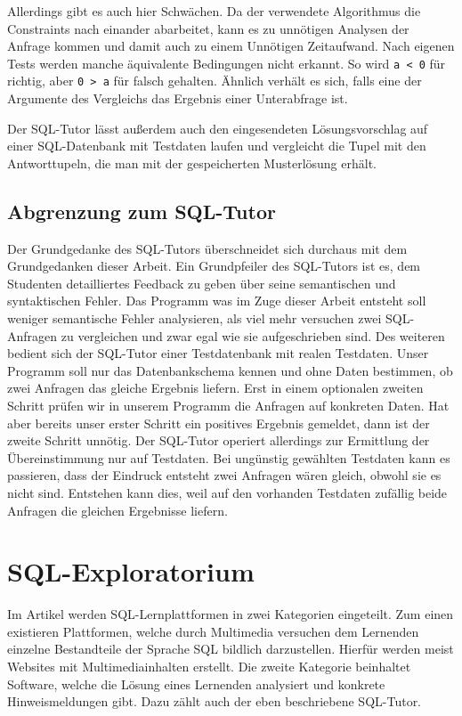 Allerdings gibt es auch hier Schwächen. Da der verwendete Algorithmus die Constraints nach einander abarbeitet, kann es zu unnötigen Analysen der Anfrage kommen und damit auch zu einem Unnötigen Zeitaufwand. Nach eigenen Tests werden manche äquivalente Bedingungen nicht erkannt. So wird \verb|a < 0| für richtig, aber \verb|0 > a| für falsch gehalten. Ähnlich verhält es sich, falls eine der Argumente des Vergleichs das Ergebnis einer Unterabfrage ist.

Der SQL-Tutor lässt außerdem auch den eingesendeten Lösungsvorschlag auf einer SQL-Datenbank mit Testdaten laufen und vergleicht die Tupel mit den Antworttupeln, die man mit der gespeicherten Musterlösung erhält.

\subsection*{Abgrenzung zum SQL-Tutor}

Der Grundgedanke des SQL-Tutors überschneidet sich durchaus mit dem Grundgedanken dieser Arbeit. Ein Grundpfeiler des SQL-Tutors ist es, dem Studenten detailliertes Feedback zu geben über seine semantischen und syntaktischen Fehler. Das Programm was im Zuge dieser Arbeit entsteht soll weniger semantische Fehler analysieren, als viel mehr versuchen zwei SQL-Anfragen zu vergleichen und zwar egal wie sie aufgeschrieben sind. Des weiteren bedient sich der SQL-Tutor einer Testdatenbank mit realen Testdaten. Unser Programm soll nur das Datenbankschema kennen und ohne Daten bestimmen, ob zwei Anfragen das gleiche Ergebnis liefern. Erst in einem optionalen zweiten Schritt prüfen wir in unserem Programm die Anfragen auf konkreten Daten. Hat aber bereits unser erster Schritt ein positives Ergebnis gemeldet, dann ist der zweite Schritt unnötig. Der SQL-Tutor operiert allerdings zur Ermittlung der Übereinstimmung nur auf Testdaten. Bei ungünstig gewählten Testdaten kann es passieren, dass der Eindruck entsteht zwei Anfragen wären gleich, obwohl sie es nicht sind. Entstehen kann dies, weil auf den vorhanden Testdaten zufällig beide Anfragen die gleichen Ergebnisse liefern.

\section{SQL-Exploratorium}

Im Artikel \cite{explora1} werden SQL-Lernplattformen in zwei Kategorien eingeteilt. Zum einen existieren Plattformen, welche durch Multimedia versuchen dem Lernenden einzelne Bestandteile der Sprache SQL bildlich darzustellen. Hierfür werden meist Websites mit Multimediainhalten erstellt. Die zweite Kategorie beinhaltet Software, welche die Lösung eines Lernenden analysiert und konkrete Hinweismeldungen gibt. Dazu zählt auch der eben beschriebene SQL-Tutor.

